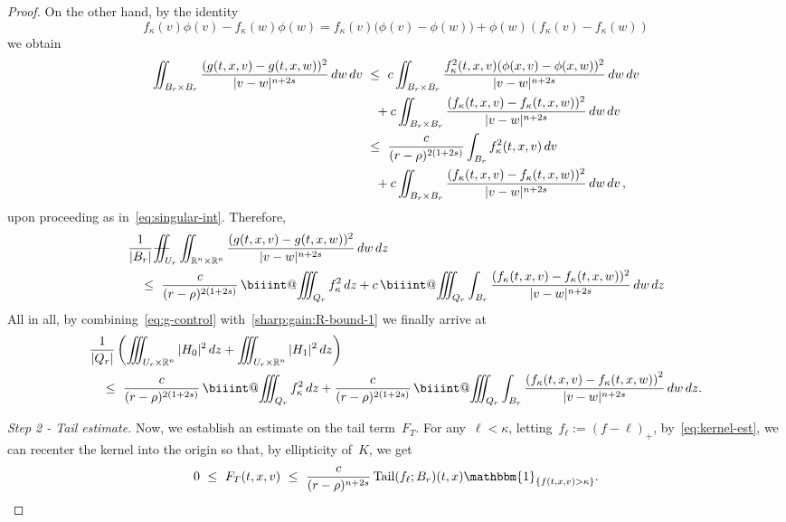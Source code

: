 \documentclass[leqno,10pt]{amsart}
\makeatletter
\theoremstyle{plain}
\theoremstyle{remark}
\numberwithin{equation}{section}
\DeclareMathOperator*{\tail}{{\rm Tail}}
\def\dz{\,{\rm d}z}
\def\dv{\,{\rm d}v}
\def\dw{\,{\rm d}w}
\def \d{\,{\rm d}}
\def\ern{\mathbb{R}^n}
\newcommand{\kk}{\kappa}
\newcommand{\rr}{\rho}
\def\Xiint#1{\mathchoice
    {\XXiint\displaystyle\textstyle{#1}}%
    {\XXiint\textstyle\scriptstyle{#1}}%
    {\XXiint\scriptstyle\scriptscriptstyle{#1}}%
    {\XXiint\scriptscriptstyle\scriptscriptstyle{#1}}%
    \!\iint}
\def\XXiint#1#2#3{\setbox0=\hbox{$#1{#2#3}{\iint}$}
    \vcenter{\hbox{$#2#3$}}\kern-0.5\wd0}
\def\biint{\Xiint{-\!-}}
\def\biiint{%
  \mathop{\mathpalette\biiint@{}}\nolimits\!\iiint}
\def\biiint@#1#2{%
  \begingroup
  \setbox0=\hbox{$\m@th#1\iiint$}%
  \dimen@=.81\wd0 %
  \rlap{\hbox to\wd0{%
    \vphantom{\copy0}%
    \hfil$\m@th#1\vcenter{%
      \hrule width\dimen@ height.30pt
    }$\hfil
  }}%
  \endgroup}
\makeatother
\begin{document}
{\begin{proof}
   On the other hand, by the identity
   \[
   f_\kk(v)\phi(v) - f_\kk(w)\phi(w) = f_\kk(v) \big(\phi(v)-\phi(w)\big) + \phi(w)(f_\kk(v)-f_\kk(w))
   \]
   we obtain
   \[
   \begin{aligned}
       \iint_{B_r \times B_r}\frac{(g(t,x,v)-g(t,x,w))^2}{|v-w|^{n+2s}}\dw\dv & \ \leq \ c\iint_{B_r \times B_r}\frac{f_\kk^2(t,x,v)(\phi(x,v)-\phi(x,w))^2}{|v-w|^{n+2s}}\dw\dv\\
       & \quad + c\iint_{B_r \times B_r}\frac{(f_\kk(t,x,v)-f_\kk(t,x,w))^2}{|v-w|^{n+2s}}\dw\dv\\
       & \ \leq \ \frac{c}{(r-\rho)^{2(1+2s)}}\int_{B_r}f_\kk^2(t,x,v)\dv  \\
       & \quad + c\iint_{B_r \times B_r}\frac{(f_\kk(t,x,v)-f_\kk(t,x,w))^2}{|v-w|^{n+2s}}\dw\dv\,,
   \end{aligned}
   \]
   upon proceeding as in~\eqref{eq:singular-int}. Therefore,
   \begin{equation}\label{eq:g-control}
   \begin{aligned}
       &\frac{1}{|B_r|}\biint_{U_r} \iint_{\ern\times\ern}\frac{(g(t,x,v)-g(t,x,w))^2}{|v-w|^{n+2s}}\dw\dz \\
       &\quad \leq \ \frac{c}{(r-\rho)^{2(1+2s)}}\biiint_{Q_r}f_\kk^2\dz  
        + c\biiint_{Q_r}\int_{B_r}\frac{(f_\kk(t,x,v)-f_\kk(t,x,w))^2}{|v-w|^{n+2s}}\dw\dz
   \end{aligned}
   \end{equation}
  All in all, by combining~\eqref{eq:g-control} with~\eqref{sharp:gain:R-bound-1} we finally arrive at
 \begin{equation}\label{sharp:gain:R-bound}
   \begin{aligned}
    & \frac{1}{|Q_r|}\left(\iiint_{U_r\times\ern}|H_0|^2\dz  +\iiint_{U_r\times\ern}|H_1|^2\dz\right)\\
    & \quad \leq \   \frac{c}{(r-\rr)^{2(1+2s)}}\biiint_{Q_r}f_\kk^2\d z 
     +\frac{c}{(r-\rr)^{2(1+2s)}}\biiint_{Q_r}\int_{B_r}
      \frac{\left(f_\kk(t,x,v)-f_\kk(t,x,w)\right)^2}{|v-w|^{n+2s}}\dw\dz.
    \end{aligned} 
    \end{equation}
    
  \medskip
  { \it Step 2 - Tail estimate.} Now, we establish an estimate on the tail term~$F_T$.
  For any~$\ell < \kk$, letting~$f_\ell := (f-\ell)_+$, by~\eqref{eq:kernel-est}, we can recenter the kernel into the origin so that, by ellipticity of~$K$, we get
   \begin{equation}\label{sharp:gain:FT-pointwise}
   0 \ \leq  \ F_T(t,x,v) \ \leq \ \frac{c}{(r-\rho)^{n+2s}}\tail(f_\ell;B_r)(t,x)\mathbbm{1}_{\{f(t,x,v)>\kk\}}.
   \end{equation}
  

\end{proof}}
\end{document}
